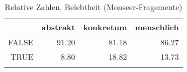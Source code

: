 \begin{table}[ht]
\centering
\begin{tabular}{rrrr}
  \lsptoprule
 & abstrakt & konkretum & menschlich \\ 
  \midrule
FALSE & 91.20 & 81.18 & 86.27 \\ 
  TRUE & 8.80 & 18.82 & 13.73 \\ 
   \lspbottomrule
\end{tabular}
\caption{Relative Zahlen, Belebtheit  (Monseer-Fragemente)} 
\end{table}
